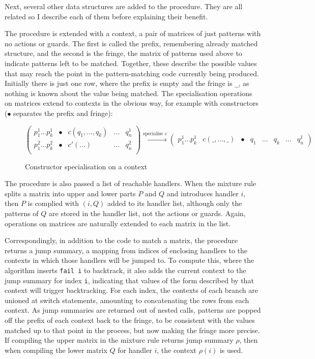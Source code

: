 Next, several other data structures are added to the procedure. They are all related so I describe each of them before explaining their benefit. 

The procedure is extended with a context, a pair of matrices of just patterns with no actions or guards. The first is called the prefix, remembering already matched structure, and the second is the fringe, the matrix of patterns used above to indicate patterns left to be matched. Together, these describe the possible values that may reach the point in the pattern-matching code currently being produced. Initially there is just one row, where the prefix is empty and the fringe is \verb|_|, as nothing is known about the value being matched. The specialisation operations on matrices extend to contexts in the obvious way, for example with constructors ($\bullet$ separates the prefix and fringe):

\begin{figure}[H]
$
\begin{pmatrix}
 p^1_1 \dots  p^1_k & \bullet & c(q_1, \dots, q_k) & \dots & q^1_n \\
 p^2_1 \dots  p^2_k &\bullet & c'(\dots)  & \dots & q^2_n  \\
\end{pmatrix}
\xrightarrow{\text{specialise } c}
\begin{pmatrix}
p^1_1 \dots  p^1_k  & c(\_, \dots, \_) & \bullet &  q_1 & \dots & q_k & \dots &  q^1_n 
\end{pmatrix}
$
\caption{Constructor specialisation on a context}
\end{figure}

The procedure is also passed a list of reachable handlers. When the mixture rule splits a matrix into upper and lower parts $P$ and $Q$ and introduces handler $i$, then $P$ is complied with $(i, Q)$ added to its handler list, although only the patterns of $Q$ are stored in the handler list, not the actions or guards. Again, operations on matrices are naturally extended to each matrix in the list. 

Correspondingly, in addition to the code to match a matrix, the procedure returns a jump summary, a mapping from indices of enclosing handlers to the contexts in which those handlers will be jumped to. To compute this, where the algorithm inserts \verb|fail i| to backtrack, it also adds the current context to the jump summary for index \verb|i|, indicating that values of the form described by that context will trigger backtracking. For each index, the contexts of each branch are unioned at switch statements, amounting to concatenating the rows from each context. As jump summaries are returned out of nested calls, patterns are popped off the prefix of each context back to the fringe, to be consistent with the values matched up to that point in the process, but now making the fringe more precise. 
If compiling the upper matrix in the mixture rule returns jump summary $\rho$, then when compiling the lower matrix $Q$ for handler $i$, the context $\rho(i)$ is used.%


